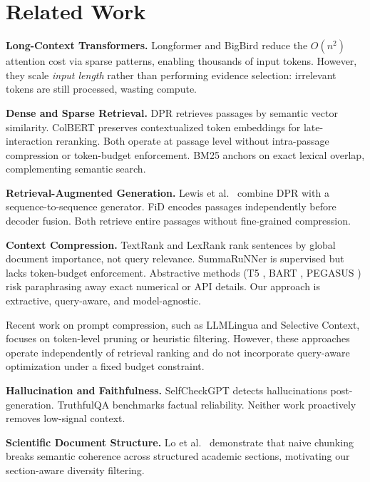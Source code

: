 \documentclass[conference]{IEEEtran}
\begin{document}
\section{Related Work}

\textbf{Long-Context Transformers.}
Longformer \cite{beltagy2020longformer} and BigBird
\cite{zaheer2020bigbird} reduce the $O(n^2)$ attention cost
via sparse patterns, enabling thousands of input tokens.
However, they scale \emph{input length} rather than performing
evidence selection: irrelevant tokens are still processed,
wasting compute.

\textbf{Dense and Sparse Retrieval.}
DPR \cite{karpukhin2020dpr} retrieves passages by semantic
vector similarity. ColBERT \cite{khattab2020colbert} preserves
contextualized token embeddings for late-interaction reranking.
Both operate at passage level without intra-passage compression
or token-budget enforcement. BM25 \cite{robertson1995okapi}
anchors on exact lexical overlap, complementing semantic search.

\textbf{Retrieval-Augmented Generation.}
Lewis et al.\ \cite{lewis2020rag} combine DPR with a
sequence-to-sequence generator. FiD \cite{izacard2021fid}
encodes passages independently before decoder fusion. Both
retrieve entire passages without fine-grained compression.

\textbf{Context Compression.}
TextRank \cite{mihalcea2004textrank} and LexRank
\cite{erkan2004lexrank} rank sentences by global document
importance, not query relevance. SummaRuNNer
\cite{nallapati2017summarunner} is supervised but lacks
token-budget enforcement. Abstractive methods (T5
\cite{raffel2020t5}, BART \cite{lewis2020bart}, PEGASUS
\cite{zhang2020pegasus}) risk paraphrasing away exact
numerical or API details. Our approach is extractive,
query-aware, and model-agnostic.

Recent work on prompt compression, such as LLMLingua and Selective Context, focuses on token-level pruning or heuristic filtering. However, these approaches operate independently of retrieval ranking and do not incorporate query-aware optimization under a fixed budget constraint.

\textbf{Hallucination and Faithfulness.}
SelfCheckGPT \cite{manakul2023selfcheckgpt} detects
hallucinations post-generation. TruthfulQA
\cite{lin2022truthfulqa} benchmarks factual reliability.
Neither work proactively removes low-signal context.

\textbf{Scientific Document Structure.}
Lo et al.\ \cite{lo2020s2orc} demonstrate that naive chunking
breaks semantic coherence across structured academic sections,
motivating our section-aware diversity filtering.
\end{document}
